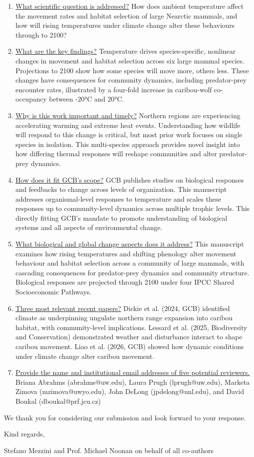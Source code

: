 \documentclass{article}
\begin{document}
\begin{enumerate}
\item \underline{What scientific question is addressed?} How does ambient temperature affect the movement rates and habitat selection of large Nearctic mammals, and how will rising temperatures under climate change alter these behaviours through to 2100?
\item \underline{What are the key findings?} Temperature drives species-specific, nonlinear changes in movement and habitat selection across six large mammal species. Projections to 2100 show how some species will move more, others less. These changes have consequences for community dynamics, including predator-prey encounter rates, illustrated by a four-fold increase in caribou-wolf co-occupancy between -20°C and 20°C.
\item \underline{Why is this work important and timely?} Northern regions are experiencing accelerating warming and extreme heat events. Understanding how wildlife will respond to this change is critical, but  most prior work focuses on single species in isolation. This multi-species approach provides novel insight into how differing thermal responses will reshape communities and alter predator-prey dynamics.
\item \underline{How does it fit GCB's scope?} GCB publishes studies on biological responses and feedbacks to change across levels of organization. This manuscript addresses organismal-level responses to temperature and scales these responses up to community-level dynamics across multiple trophic levels. This directly fitting GCB's mandate to promote understanding of biological systems and all aspects of environmental change.
\item \underline{What biological and global change aspects does it address?} This manuscript examines how rising temperatures and shifting phenology alter movement behaviour and habitat selection across a community of large mammals, with cascading consequences for predator-prey dynamics and community structure. Biological responses are projected through 2100 under four IPCC Shared Socioeconomic Pathways.
\item \underline{Three most relevant recent papers?} Dickie et al. (2024, GCB) identified climate as underpinning ungulate northern range expansion into caribou habitat, with community-level implications. Lessard et al. (2025, Biodiversity and Conservation) demonstrated weather and disturbance interact to shape caribou movement. Liao et al. (2026, GCB) showed how dynamic conditions under climate change alter caribou movement.
\item \underline{Provide the name and institutional email addresses of five potential reviewers.} Briana Abrahms (abrahms@uw.edu), Laura Prugh (lprugh@uw.edu), Marketa Zimova (mzimova@uwyo.edu), John DeLong (jpdelong@unl.edu), and David Boukal (dboukal@prf.jcu.cz)
\end{enumerate}


We thank you for considering our submission and look forward to your response.

Kind regards,

Stefano Mezzini and Prof. Michael Noonan on behalf of all co-authors
\end{document}
